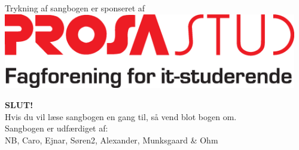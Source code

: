 \newpage

\pagecolor{ProcessBlue}

\pagestyle{empty}
\begin{center}

{\large Trykning af sangbogen er sponseret af \vspace{0.5cm}} \\
\includegraphics[width=0.96\textwidth]{res/prosalogo.eps} \\

%
%

\vspace{7cm}

{\Huge \textbf{SLUT!}}\\
{\large Hvis du vil læse sangbogen en gang til, så vend blot bogen
  om.}\\
\vspace{0.5cm}
Sangbogen er udfærdiget af:\\
NB, Caro, Ejnar, Søren2, Alexander, Munksgaard \& Ohm
\end{center}
